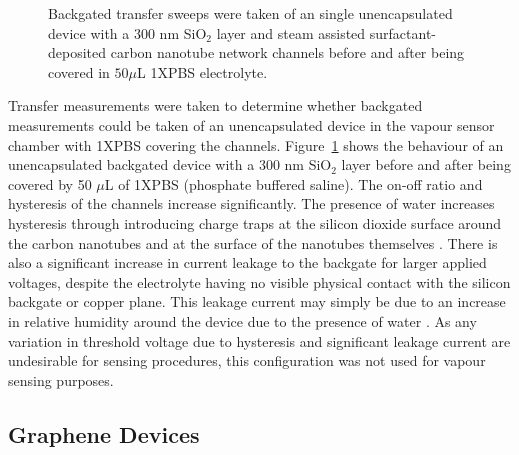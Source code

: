 \documentclass[
  a4paper,
]{scrbook}
\begin{document}
\begin{figure}
\begin{minipage}[t]{0.47\linewidth}
{{}

}

\subcaption{\label{fig-50uL-buffer}}
\end{minipage}%

\caption{\label{fig-buffer-effect-on-backgate}Backgated transfer sweeps
were taken of an single unencapsulated device with a 300 nm SiO\(_2\)
layer and steam assisted surfactant-deposited carbon nanotube network
channels before and after being covered in \(50 \mu\)L 1XPBS
electrolyte.}

\end{figure}

Transfer measurements were taken to determine whether backgated
measurements could be taken of an unencapsulated device in the vapour
sensor chamber with 1XPBS covering the channels.
Figure~\ref{fig-buffer-effect-on-backgate} shows the behaviour of an
unencapsulated backgated device with a 300 nm SiO\(_2\) layer before and
after being covered by 50 \(\mu\)L of 1XPBS (phosphate buffered saline).
The on-off ratio and hysteresis of the channels increase significantly.
The presence of water increases hysteresis through introducing charge
traps at the silicon dioxide surface around the carbon nanotubes and at
the surface of the nanotubes themselves
\autocite{Kim2003,Lee2007,Franklin2012,Ha2014}. There is also a
significant increase in current leakage to the backgate for larger
applied voltages, despite the electrolyte having no visible physical
contact with the silicon backgate or copper plane. This leakage current
may simply be due to an increase in relative humidity around the device
due to the presence of water \autocite{Conseil2014}. As any variation in
threshold voltage due to hysteresis and significant leakage current are
undesirable for sensing procedures, this configuration was not used for
vapour sensing purposes.

\hypertarget{graphene-devices}{%
\subsection{Graphene Devices}\label{graphene-devices}}
\end{document}
